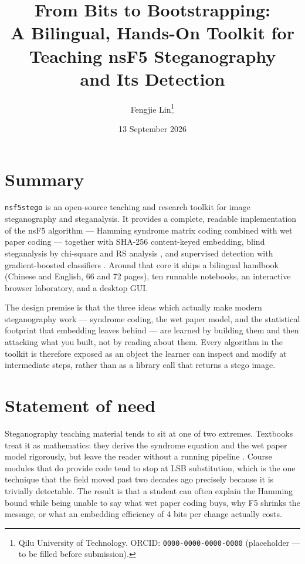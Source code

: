 \documentclass[11pt,a4paper]{article}
\title{\vspace{-1.6cm}\bfseries From Bits to Bootstrapping:\\[3pt]
A Bilingual, Hands-On Toolkit for Teaching nsF5 Steganography\\[3pt]
and Its Detection}
\author{Fengjie Lin\thanks{Qilu University of Technology.
  ORCID: \texttt{0000-0000-0000-0000} (placeholder --- to be filled before submission).}}
\date{13 September 2026}
\begin{document}
\maketitle
\vspace{-1.2em}

\section*{Summary}

\texttt{nsf5stego} is an open-source teaching and research toolkit for image
steganography and steganalysis. It provides a complete, readable implementation
of the nsF5 algorithm --- Hamming syndrome matrix coding combined with wet paper
coding \citep{westfeld2001f5,fridrich2005wet} --- together with SHA-256
content-keyed embedding, blind steganalysis by chi-square and RS analysis
\citep{westfeld1999,fridrich2001rs}, and supervised detection with
gradient-boosted classifiers \citep{ke2017lightgbm}. Around that core it ships a
bilingual handbook (Chinese and English, 66 and 72 pages), ten runnable
notebooks, an interactive browser laboratory, and a desktop GUI.

The design premise is that the three ideas which actually make modern
steganography work --- syndrome coding, the wet paper model, and the statistical
footprint that embedding leaves behind --- are learned by building them and then
attacking what you built, not by reading about them. Every algorithm in the
toolkit is therefore exposed as an object the learner can inspect and modify at
intermediate steps, rather than as a library call that returns a stego image.

\section*{Statement of need}

Steganography teaching material tends to sit at one of two extremes. Textbooks
treat it as mathematics: they derive the syndrome equation and the wet paper
model rigorously, but leave the reader without a running pipeline
\citep{fridrich2009book,provos2003hide}. Course modules that do provide code tend
to stop at LSB substitution, which is the one technique that the field moved past
two decades ago precisely because it is trivially detectable. The result is that
a student can often explain the Hamming bound while being unable to say what wet
paper coding buys, why F5 shrinks the message, or what an embedding efficiency of
4 bits per change actually costs.
\end{document}
